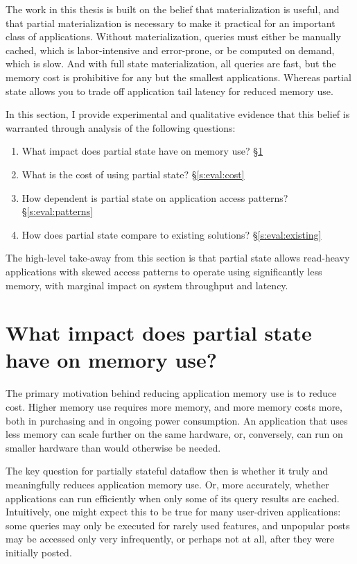 The work in this thesis is built on the belief that materialization is useful,
and that partial materialization is necessary to make it practical for an
important class of applications. Without materialization, queries must either be
manually cached, which is labor-intensive and error-prone, or be computed on
demand, which is slow. And with full state materialization, all queries are
fast, but the memory cost is prohibitive for any but the smallest applications.
Whereas partial state allows you to trade off application tail latency for
reduced memory use.

In this section, I provide experimental and qualitative evidence that this
belief is warranted through analysis of the following questions:

\begin{enumerate}
 \item What impact does partial state have on memory use? \S\ref{s:eval:mem}
 \item What is the cost of using partial state? \S\ref{s:eval:cost}
 \item How dependent is partial state on application access patterns? \S\ref{s:eval:patterns}
 \item How does partial state compare to existing solutions? \S\ref{s:eval:existing}
\end{enumerate}

The high-level take-away from this section is that partial state allows
read-heavy applications with skewed access patterns to operate using
significantly less memory, with marginal impact on system throughput and
latency.

\section{What impact does partial state have on memory use?}
\label{s:eval:mem}

The primary motivation behind reducing application memory use is to reduce cost.
Higher memory use requires more memory, and more memory costs more, both in
purchasing and in ongoing power consumption. An application that uses less
memory can scale further on the same hardware, or, conversely, can run on
smaller hardware than would otherwise be needed.

The key question for partially stateful dataflow then is whether it truly and
meaningfully reduces application memory use. Or, more accurately, whether
applications can run efficiently when only some of its query results are cached.
Intuitively, one might expect this to be true for many user-driven applications:
some queries may only be executed for rarely used features, and unpopular posts
may be accessed only very infrequently, or perhaps not at all, after they were
initially posted.

